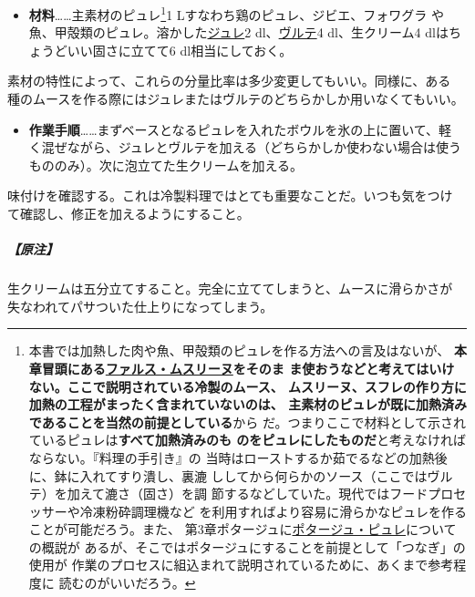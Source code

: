 \begin{recette}
\begin{itemize}
\tightlist
\item
  \textbf{材料}\ldots{}\ldots{}主素材のピュレ\footnote{本書では加熱した肉や魚、甲殻類のピュレを作る方法への言及はないが、
    \textbf{本章冒頭にある\protect\hyperlink{farce-mousseline}{ファルス・ムスリーヌ}をそのま
    ま使おうなどと考えてはいけない。ここで説明されている冷製のムース、
    ムスリーヌ、スフレの作り方に加熱の工程がまったく含まれていないのは、
    主素材のピュレが既に加熱済みであることを当然の前提としている}から
    だ。つまりここで材料として示されているピュレは\textbf{すべて加熱済みのも
    のをピュレにしたものだ}と考えなければならない。『料理の手引き』の
    当時はローストするか茹でるなどの加熱後に、鉢に入れてすり潰し、裏漉
    ししてから何らかのソース（ここではヴルテ）を加えて漉さ（固さ）を調
    節するなどしていた。現代ではフードプロセッサーや冷凍粉砕調理機など
    を利用すればより容易に滑らかなピュレを作ることが可能だろう。また、
    第3章ポタージュに\protect\hyperlink{les-purees}{ポタージュ・ピュレ}についての概説が
    あるが、そこではポタージュにすることを前提として「つなぎ」の使用が
    作業のプロセスに組込まれて説明されているために、あくまで参考程度に
    読むのがいいだろう。}1 Lすなわち鶏のピュレ、ジビエ、フォワグラ
  や魚、甲殻類のピュレ。溶かした\protect\hyperlink{gelees-ordinaires}{ジュレ}2\undemi{}
  dl、\protect\hyperlink{veloute}{ヴルテ}4 dl、生クリーム4
  dlはちょうどいい固さに立てて6 dl相当にしておく。
\end{itemize}

素材の特性によって、これらの分量比率は多少変更してもいい。同様に、ある
種のムースを作る際にはジュレまたはヴルテのどちらかしか用いなくてもいい。

\begin{itemize}
\tightlist
\item
  \textbf{作業手順}\ldots{}\ldots{}まずベースとなるピュレを入れたボウルを氷の上に置いて、軽
  く混ぜながら、ジュレとヴルテを加える（どちらかしか使わない場合は使う
  もののみ）。次に泡立てた生クリームを加える。
\end{itemize}

味付けを確認する。これは冷製料理ではとても重要なことだ。いつも気をつけ
て確認し、修正を加えるようにすること。

\hypertarget{nota-composition-de-l-appareil-pour-mousses-et-mousseline-froides}{%
\subparagraph{【原注】}\label{nota-composition-de-l-appareil-pour-mousses-et-mousseline-froides}}

生クリームは五分立てすること。完全に立ててしまうと、ムースに滑らかさが
失なわれてパサついた仕上りになってしまう。


\end{recette}
